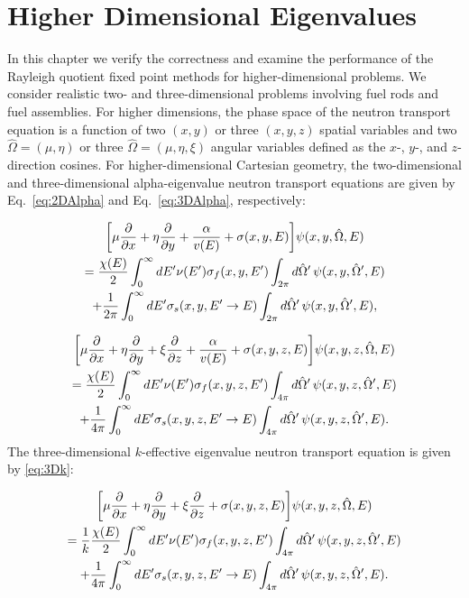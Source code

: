 \chapter{Higher Dimensional Eigenvalues}

In this chapter we verify the correctness and examine the performance of the Rayleigh quotient fixed point methods for higher-dimensional problems. We consider realistic two- and three-dimensional problems involving fuel rods and fuel assemblies. For higher dimensions, the phase space of the neutron transport equation is a function of two $(x, y)$ or three $(x, y, z)$ spatial variables and two $\hat{\Omega} = (\mu, \eta)$ or three $\hat{\Omega} =  (\mu, \eta, \xi)$ angular variables defined as the $x$-, $y$-, and $z$-direction cosines. For higher-dimensional Cartesian geometry, the two-dimensional and three-dimensional alpha-eigenvalue neutron transport equations are given by Eq.~\ref{eq:2DAlpha} and Eq.~\ref{eq:3DAlpha}, respectively:

\begin{multline}
\bigg [ \mu \frac{\partial}{\partial x} + \eta \frac{\partial}{\partial y} + \frac{\alpha}{v(E)} + \sigma(x,y,E) \bigg ] \psi(x,y,\hat{\Omega},E) \\ = \frac{\chi(E)}{2} \int_{0}^{\infty} \mathop{}\!d E' \nu(E') \sigma_{f}(x,y,E') \int_{2\pi} \mathop{}\!d \hat{\Omega}' \, \psi(x,y, \hat{\Omega}', E) \\ + \frac{1}{2\pi} \int_{0}^{\infty} \mathop{}\!d E' \sigma_{s}(x, y, E' \rightarrow E) \int_{2\pi} \mathop{}\!d \hat{\Omega}' \, \psi(x,y, \hat{\Omega}',E),
\label{eq:2DAlpha}
\end{multline}

\begin{multline}
\bigg [ \mu \frac{\partial}{\partial x} + \eta \frac{\partial}{\partial y} + \xi \frac{\partial}{\partial z} + \frac{\alpha}{v(E)} + \sigma(x,y,z,E) \bigg ] \psi(x,y,z,\hat{\Omega}, E) \\ = \frac{\chi(E)}{2} \int_{0}^{\infty} \mathop{}\!d E' \nu(E') \sigma_{f}(x,y,z,E') \int_{4\pi} \mathop{}\!d \hat{\Omega}' \, \psi(x,y,z, \hat{\Omega}',E) \\ + \frac{1}{4\pi} \int_{0}^{\infty} \mathop{}\!d E' \sigma_{s}(x, y, z, E' \rightarrow E) \int_{4\pi} \mathop{}\!d \hat{\Omega}' \, \psi(x,y,z, \hat{\Omega}',E).
\label{eq:3DAlpha}
\end{multline}
The three-dimensional $k$-effective eigenvalue neutron transport equation is given by \ref{eq:3Dk}:

\begin{multline}
\bigg [ \mu \frac{\partial}{\partial x} + \eta \frac{\partial}{\partial y} + \xi \frac{\partial}{\partial z} + \sigma(x,y,z,E) \bigg ] \psi(x,y,z,\hat{\Omega}, E) \\ = \frac{1}{k}\frac{\chi(E)}{2} \int_{0}^{\infty} \mathop{}\!d E' \nu(E') \sigma_{f}(x,y,z,E') \int_{4\pi} \mathop{}\!d \hat{\Omega}' \, \psi(x,y,z, \hat{\Omega}',E) \\ + \frac{1}{4\pi} \int_{0}^{\infty} \mathop{}\!d E' \sigma_{s}(x, y, z, E' \rightarrow E) \int_{4\pi} \mathop{}\!d \hat{\Omega}' \, \psi(x,y,z, \hat{\Omega}',E).
\label{eq:3Dk}
\end{multline}

